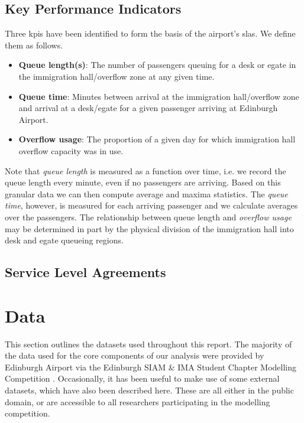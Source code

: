 \documentclass[10pt]{article}
\begin{document}
\subsection{Key Performance Indicators}

Three \glspl{kpi} have been identified to form the basis of the airport's \glspl{sla}. We define them as follows.

\begin{itemize}
    \item \textbf{Queue length(s)}: The number of passengers queuing for a desk or \gls{egate} in the immigration hall/overflow zone at any given time.
    \item \textbf{Queue time}: Minutes between arrival at the immigration hall/overflow zone and arrival at a desk/\gls{egate} for a given passenger arriving at Edinburgh Airport. 
    \item \textbf{Overflow usage}: The proportion of a given day for which immigration hall overflow capacity was in use.
\end{itemize}

Note that \textit{queue length} is measured as a function over time, i.e. we record the queue length every minute, even if no passengers are arriving. Based on this granular data we can then compute average and maxima statistics. The \textit{queue time}, however, is measured for each arriving passenger and we calculate averages over the passengers. The relationship between queue length and \textit{overflow usage} may be determined in part by the physical division of the immigration hall into desk and \gls{egate} queueing regions.

\subsection{Service Level Agreements}


\section{Data}
This section outlines the datasets used throughout this report. The majority of the data used for the core components of our analysis were provided by Edinburgh Airport via the Edinburgh SIAM \& IMA Student Chapter Modelling Competition \cite{modelling_competition}. Occasionally, it has been useful to make use of some external datasets, which have also been described here. These are all either in the public domain, or are accessible to all researchers participating in the modelling competition. 
\end{document}
